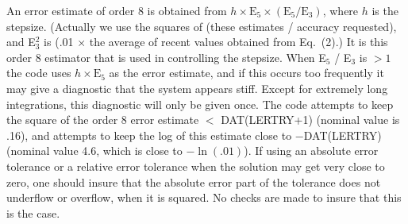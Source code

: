\documentclass[twoside]{MATH77}
\begin{document}
An error estimate of order 8 is obtained from $h \times \text{E}_5
\times (\text{E}_5 / \text{E}_3)$, where $h$ is the stepsize.
(Actually we use the squares of (these estimates / accuracy
requested), and E$_3^2$ is (.01 $\times$ the average of recent values
obtained from Eq.~(2).) It is this order 8 estimator that is used in
controlling the stepsize.  When E$_5$ / E$_3$ is $> 1$ the code uses
$h\times \text{E}_5$ as the error estimate, and if this occurs too
frequently it may give a diagnostic that the system appears stiff.
Except for extremely long integrations, this diagnostic will only be
given once.  The code attempts to keep the square of the order 8 error
estimate $<$ DAT(LERTRY+1) (nominal value is .16), and attempts to
keep the log of this estimate close to $-$DAT(LERTRY) (nominal value
4.6, which is close to $-\ln(.01)$).  If using an absolute error
tolerance or a relative error tolerance when the solution may get very
close to zero, one should insure that the absolute error part of the
tolerance does not underflow or overflow, when it is squared.  No
checks are made to insure that this is the case.



\end{document}
